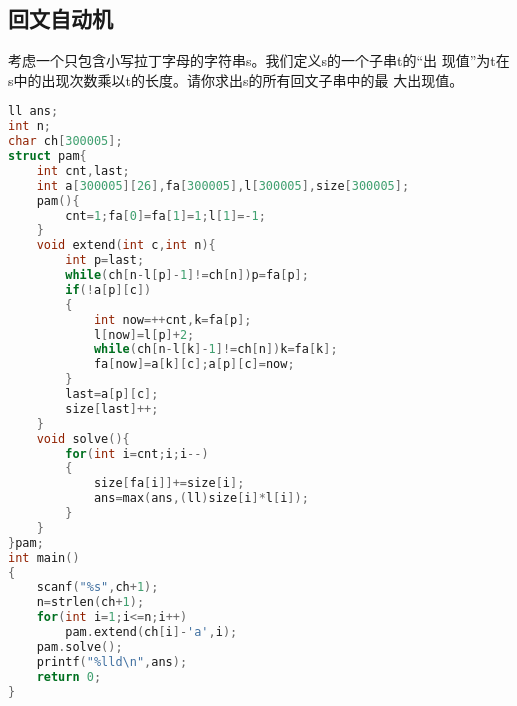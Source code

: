 \subsection{回文自动机}
考虑一个只包含小写拉丁字母的字符串s。我们定义s的一个子串t的“出
现值”为t在s中的出现次数乘以t的长度。请你求出s的所有回文子串中的最
大出现值。
\begin{lstlisting}[language=C]
ll ans;
int n;
char ch[300005];
struct pam{
	int cnt,last;
	int a[300005][26],fa[300005],l[300005],size[300005];
	pam(){
	    cnt=1;fa[0]=fa[1]=1;l[1]=-1;
	}
	void extend(int c,int n){
		int p=last;
		while(ch[n-l[p]-1]!=ch[n])p=fa[p];
		if(!a[p][c])
		{
			int now=++cnt,k=fa[p];
			l[now]=l[p]+2;
			while(ch[n-l[k]-1]!=ch[n])k=fa[k];
			fa[now]=a[k][c];a[p][c]=now;
		}
		last=a[p][c];
		size[last]++;
	}
	void solve(){
		for(int i=cnt;i;i--)
		{
			size[fa[i]]+=size[i];
			ans=max(ans,(ll)size[i]*l[i]);
		}
	}
}pam;
int main()
{
	scanf("%s",ch+1);
	n=strlen(ch+1);
	for(int i=1;i<=n;i++)
		pam.extend(ch[i]-'a',i);
	pam.solve();
	printf("%lld\n",ans);
	return 0;
}
\end{lstlisting}
